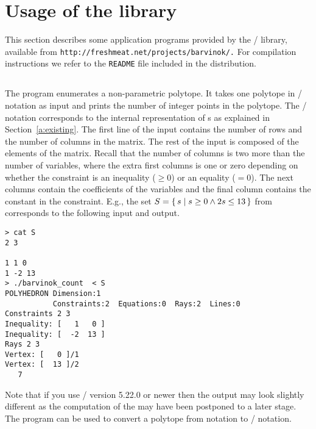 \section{\texorpdfstring{Usage of the \protect{} library}
{Usage of the barvinok library}}
\label{a:usage}

{\sloppy 
This section describes some application programs
provided by the \barvinok/ library,
available from {\tt http://freshmeat.net/projects/barvinok/.}
For compilation instructions we refer to the \verb+README+ file
included in the distribution.
}

\subsection{\texorpdfstring{\protect{}}{barvinok\_count}}

The program  enumerates a
non-parametric polytope.  It takes one polytope
in \PolyLib/ notation as input and prints the number
of integer points in the polytope.
The \PolyLib/ notation corresponds to the internal
representation of s as explained
in Section~\ref{a:existing}.
The first line of the input contains the number of rows
and the number of columns in the  matrix.
The rest of the input is composed of the elements of the matrix.
Recall that the number of columns is two more than the number
of variables, where the extra first columns is one or zero
depending on whether the constraint is an inequality ($\ge 0$)
or an equality ($= 0$).  The next columns contain
the coefficients of the variables and the final column contains
the constant in the constraint.
E.g., the set 
$S = \left\{\, s \mid s \geq 0 \wedge  2 s \leq 13 \, \right\}$
from 
corresponds to the following input and
output.
\begin{verbatim}
> cat S
2 3

1 1 0
1 -2 13
> ./barvinok_count  < S
POLYHEDRON Dimension:1
           Constraints:2  Equations:0  Rays:2  Lines:0
Constraints 2 3
Inequality: [   1   0 ]
Inequality: [  -2  13 ]
Rays 2 3
Vertex: [   0 ]/1
Vertex: [  13 ]/2
   7 
\end{verbatim}
Note that if you use \PolyLib/ version 5.22.0 or newer then the output
may look slightly different as the computation of the 
may have been postponed to a later stage.
The program  can be used to
convert a polytope from  
notation to \PolyLib/ notation.

